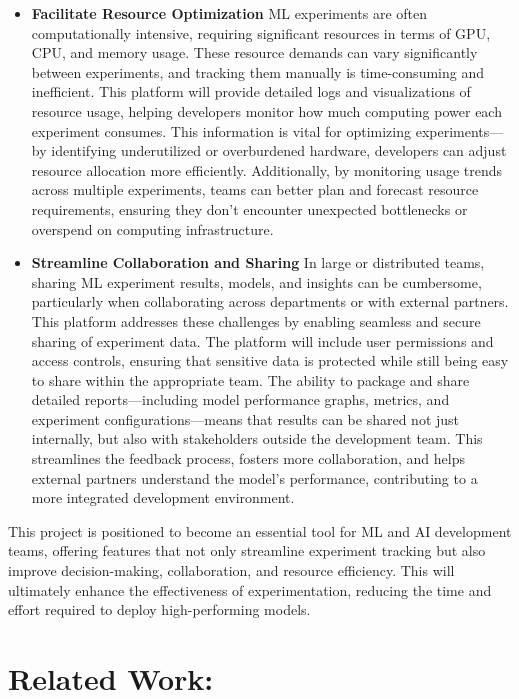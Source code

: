 \documentclass[12pt]{article}
\begin{document}
\begin{itemize}
\item \textbf{Facilitate Resource Optimization}
ML experiments are often computationally intensive, requiring significant resources in terms of GPU, CPU, and memory usage. These resource demands can vary significantly between experiments, and tracking them manually is time-consuming and inefficient. This platform will provide detailed logs and visualizations of resource usage, helping developers monitor how much computing power each experiment consumes. This information is vital for optimizing experiments—by identifying underutilized or overburdened hardware, developers can adjust resource allocation more efficiently. Additionally, by monitoring usage trends across multiple experiments, teams can better plan and forecast resource requirements, ensuring they don’t encounter unexpected bottlenecks or overspend on computing infrastructure.

\item \textbf{Streamline Collaboration and Sharing}
In large or distributed teams, sharing ML experiment results, models, and insights can be cumbersome, particularly when collaborating across departments or with external partners. This platform addresses these challenges by enabling seamless and secure sharing of experiment data. The platform will include user permissions and access controls, ensuring that sensitive data is protected while still being easy to share within the appropriate team. The ability to package and share detailed reports—including model performance graphs, metrics, and experiment configurations—means that results can be shared not just internally, but also with stakeholders outside the development team. This streamlines the feedback process, fosters more collaboration, and helps external partners understand the model’s performance, contributing to a more integrated development environment.

\end{itemize}

This project is positioned to become an essential tool for ML and AI development teams, offering features that not only streamline experiment tracking but also improve decision-making, collaboration, and resource efficiency. This will ultimately enhance the effectiveness of experimentation, reducing the time and effort required to deploy high-performing models.

\section{Related Work:}
\end{document}

